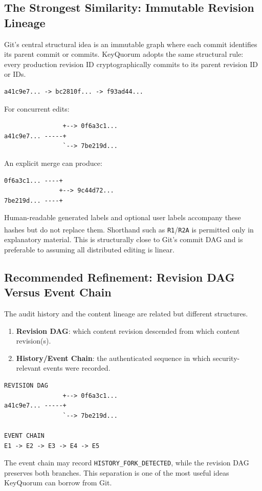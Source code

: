 \documentclass[11pt]{article}
\newcommand{\revshort}[1]{\texttt{#1}\textsuperscript{\textcolor{revisionnote}{\dag}}}
\begin{document}
\subsection{The Strongest Similarity: Immutable Revision Lineage}
Git's central structural idea is an immutable graph where each commit identifies its parent commit or commits. KeyQuorum adopts the same structural rule: every production revision ID cryptographically commits to its parent revision ID or IDs.

\begin{lstlisting}
a41c9e7... -> bc2810f... -> f93ad44...
\end{lstlisting}

For concurrent edits:

\begin{lstlisting}
                +--> 0f6a3c1...
a41c9e7... -----+
                `--> 7be219d...
\end{lstlisting}

An explicit merge can produce:

\begin{lstlisting}
0f6a3c1... ----+
               +--> 9c44d72...
7be219d... ----+
\end{lstlisting}

Human-readable generated labels and optional user labels accompany these hashes but do not replace them. Shorthand such as \revshort{R1}/\revshort{R2A} is permitted only in explanatory material. This is structurally close to Git's commit DAG and is preferable to assuming all distributed editing is linear.

\subsection{Recommended Refinement: Revision DAG Versus Event Chain}
The audit history and the content lineage are related but different structures.
\begin{enumerate}[leftmargin=1.8em]
  \item \textbf{Revision DAG}: which content revision descended from which content revision(s).
  \item \textbf{History/Event Chain}: the authenticated sequence in which security-relevant events were recorded.
\end{enumerate}

\begin{lstlisting}
REVISION DAG
                +--> 0f6a3c1...
a41c9e7... -----+
                `--> 7be219d...

EVENT CHAIN
E1 -> E2 -> E3 -> E4 -> E5
\end{lstlisting}
The event chain may record \texttt{HISTORY\_FORK\_DETECTED}, while the revision DAG preserves both branches. This separation is one of the most useful ideas KeyQuorum can borrow from Git.
\end{document}
